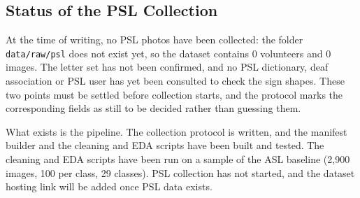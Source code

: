 \subsection{Status of the PSL Collection}

At the time of writing, no PSL photos have been collected: the folder \texttt{data/raw/psl} does not exist yet, so the dataset contains 0 volunteers and 0 images. The letter set has not been confirmed, and no PSL dictionary, deaf association or PSL user has yet been consulted to check the sign shapes. These two points must be settled before collection starts, and the protocol marks the corresponding fields as still to be decided rather than guessing them.

What exists is the pipeline. The collection protocol is written, and the manifest builder and the cleaning and EDA scripts have been built and tested. The cleaning and EDA scripts have been run on a sample of the ASL baseline (2{,}900 images, 100 per class, 29 classes). PSL collection has not started, and the dataset hosting link will be added once PSL data exists.
